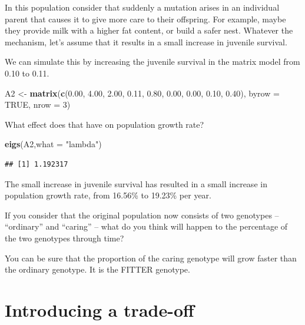 \documentclass[
  a4paper]{book}
\newenvironment{Shaded}{\begin{snugshade}}{\end{snugshade}}
\newcommand{\AttributeTok}[1]{\textcolor[rgb]{0.13,0.29,0.53}{#1}}
\newcommand{\ConstantTok}[1]{\textcolor[rgb]{0.56,0.35,0.01}{#1}}
\newcommand{\DecValTok}[1]{\textcolor[rgb]{0.00,0.00,0.81}{#1}}
\newcommand{\FloatTok}[1]{\textcolor[rgb]{0.00,0.00,0.81}{#1}}
\newcommand{\FunctionTok}[1]{\textcolor[rgb]{0.13,0.29,0.53}{\textbf{#1}}}
\newcommand{\NormalTok}[1]{#1}
\newcommand{\OtherTok}[1]{\textcolor[rgb]{0.56,0.35,0.01}{#1}}
\newcommand{\StringTok}[1]{\textcolor[rgb]{0.31,0.60,0.02}{#1}}
\begin{document}
In this population consider that suddenly a mutation arises in an individual parent that causes it to give more care to their offspring. For example, maybe they provide milk with a higher fat content, or build a safer nest. Whatever the mechanism, let's assume that it results in a small increase in juvenile survival.

We can simulate this by increasing the juvenile survival in the matrix model from 0.10 to 0.11.

\begin{Shaded}
\begin{Highlighting}[]
\NormalTok{A2 }\OtherTok{\textless{}{-}} \FunctionTok{matrix}\NormalTok{(}\FunctionTok{c}\NormalTok{(}\FloatTok{0.00}\NormalTok{, }\FloatTok{4.00}\NormalTok{, }\FloatTok{2.00}\NormalTok{, }
               \FloatTok{0.11}\NormalTok{, }\FloatTok{0.80}\NormalTok{, }\FloatTok{0.00}\NormalTok{, }
               \FloatTok{0.00}\NormalTok{, }\FloatTok{0.10}\NormalTok{, }\FloatTok{0.40}\NormalTok{), }
            \AttributeTok{byrow =} \ConstantTok{TRUE}\NormalTok{, }\AttributeTok{nrow =} \DecValTok{3}\NormalTok{)}
\end{Highlighting}
\end{Shaded}

What effect does that have on population growth rate?

\begin{Shaded}
\begin{Highlighting}[]
\FunctionTok{eigs}\NormalTok{(A2,}\AttributeTok{what =} \StringTok{"lambda"}\NormalTok{)}
\end{Highlighting}
\end{Shaded}

\begin{verbatim}
## [1] 1.192317
\end{verbatim}

The small increase in juvenile survival has resulted in a small increase in population growth rate, from 16.56\% to 19.23\% per year.

If you consider that the original population now consists of two genotypes -- ``ordinary'' and ``caring'' -- what do you think will happen to the percentage of the two genotypes through time?

You can be sure that the proportion of the caring genotype will grow faster than the ordinary genotype. It is the FITTER genotype.

\hypertarget{introducing-a-trade-off}{%
\section{Introducing a trade-off}\label{introducing-a-trade-off}}
\end{document}
